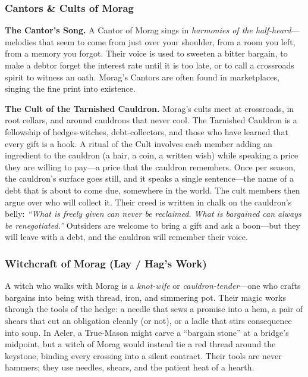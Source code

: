 \subsubsection*{Cantors \& Cults of Morag}

\textbf{The Cantor's Song.} A Cantor of Morag sings in \textit{harmonies of the half-heard}---melodies that seem to come from just over your shoulder, from a room you left, from a memory you forgot. Their voice is used to sweeten a bitter bargain, to make a debtor forget the interest rate until it is too late, or to call a crossroads spirit to witness an oath. Morag's Cantors are often found in marketplaces, singing the fine print into existence.

\textbf{The Cult of the Tarnished Cauldron.} Morag's cults meet at crossroads, in root cellars, and around cauldrons that never cool. The Tarnished Cauldron is a fellowship of hedges-witches, debt-collectors, and those who have learned that every gift is a hook. A ritual of the Cult involves each member adding an ingredient to the cauldron (a hair, a coin, a written wish) while speaking a price they are willing to pay---a price that the cauldron remembers. Once per season, the cauldron's surface goes still, and it speaks a single sentence---the name of a debt that is about to come due, somewhere in the world. The cult members then argue over who will collect it. Their creed is written in chalk on the cauldron's belly: \textit{``What is freely given can never be reclaimed. What is bargained can always be renegotiated.''} Outsiders are welcome to bring a gift and ask a boon---but they will leave with a debt, and the cauldron will remember their voice.

\subsubsection*{Witchcraft of Morag (Lay / Hag's Work)}

A witch who walks with Morag is a \textit{knot-wife} or \textit{cauldron-tender}---one who crafts bargains into being with thread, iron, and simmering pot. Their magic works through the tools of the hedge: a needle that sews a promise into a hem, a pair of shears that cut an obligation cleanly (or not), or a ladle that stirs consequence into soup. In Aeler, a True-Mason might carve a ``bargain stone'' at a bridge's midpoint, but a witch of Morag would instead tie a red thread around the keystone, binding every crossing into a silent contract. Their tools are never hammers; they use needles, shears, and the patient heat of a hearth.

